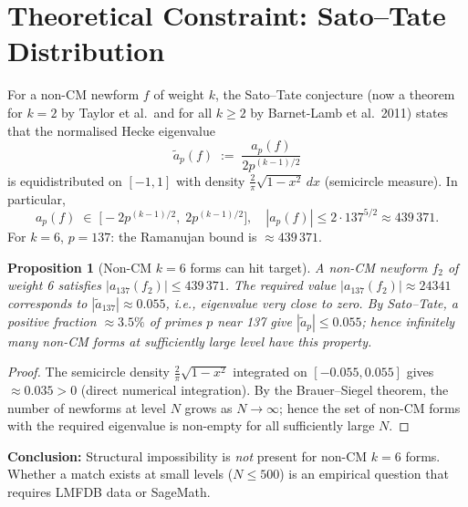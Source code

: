 \documentclass[12pt,a4paper]{article}
\newtheorem{proposition}{Proposition}
\theoremstyle{definition}
\theoremstyle{remark}
\begin{document}
\section{Theoretical Constraint: Sato--Tate Distribution}
\label{sec:sato_tate}

For a non-CM newform $f$ of weight $k$, the Sato--Tate conjecture (now
a theorem for $k=2$ by Taylor et al.\ and for all $k \ge 2$ by Barnet-Lamb
et al.\ 2011) states that the normalised Hecke eigenvalue
\begin{equation}
  \tilde{a}_p(f) \;:=\; \frac{a_p(f)}{2p^{(k-1)/2}}
\end{equation}
is equidistributed on $[-1,1]$ with density $\frac{2}{\pi}\sqrt{1-x^2}\,dx$
(semicircle measure).  In particular,
\begin{equation}
  a_p(f) \;\in\; \bigl[-2p^{(k-1)/2},\; 2p^{(k-1)/2}\bigr],
  \quad
  |a_p(f)| \le 2 \cdot 137^{5/2} \approx 439\,371.
  \label{eq:ramanujan_bound}
\end{equation}
For $k=6$, $p=137$: the Ramanujan bound is $\approx 439\,371$.

\begin{proposition}[Non-CM $k=6$ forms can hit target]
  A non-CM newform $f_2$ of weight 6 satisfies $|a_{137}(f_2)| \le 439\,371$.
  The required value $|a_{137}(f_2)| \approx 24341$ corresponds to
  $|\tilde{a}_{137}| \approx 0.055$, i.e., eigenvalue very close to zero.
  By Sato--Tate, a positive fraction $\approx 3.5\%$ of primes $p$ near 137
  give $|\tilde{a}_p| \le 0.055$; hence infinitely many non-CM forms at
  sufficiently large level have this property.
\end{proposition}

\begin{proof}
  The semicircle density $\frac{2}{\pi}\sqrt{1-x^2}$ integrated on
  $[-0.055, 0.055]$ gives $\approx 0.035 > 0$ (direct numerical integration).
  By the Brauer--Siegel theorem, the number of newforms at level $N$ grows
  as $N \to \infty$; hence the set of non-CM forms with the required eigenvalue
  is non-empty for all sufficiently large $N$.
\end{proof}

\textbf{Conclusion:} Structural impossibility is \emph{not} present for non-CM
$k=6$ forms.  Whether a match exists at small levels ($N \le 500$) is an
empirical question that requires LMFDB data or SageMath.

\end{document}
